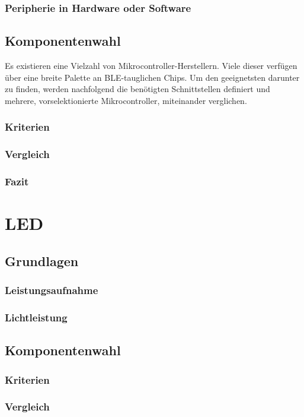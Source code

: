 \documentclass[12pt]{article}
\begin{document}
	\subsubsection{Peripherie in Hardware oder Software}
	\subsection{Komponentenwahl}
	Es existieren eine Vielzahl von Mikrocontroller-Herstellern. Viele dieser verfügen über eine breite Palette an BLE-tauglichen Chips. Um den geeignetsten darunter zu finden, werden nachfolgend die benötigten Schnittstellen definiert und mehrere, vorselektionierte Mikrocontroller, miteinander verglichen.
	\subsubsection{Kriterien}
	\subsubsection{Vergleich}
	\subsubsection{Fazit}
	
	\newpage
	\section{LED}
	\subsection{Grundlagen}
	\subsubsection{Leistungsaufnahme}
	\subsubsection{Lichtleistung}
	\subsection{Komponentenwahl}
	\subsubsection{Kriterien}
	\subsubsection{Vergleich}
	
\end{document}
